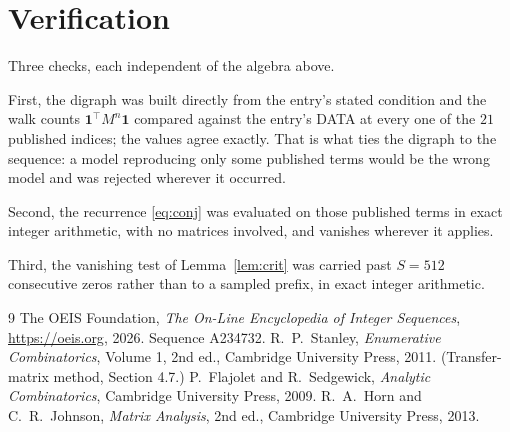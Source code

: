 \documentclass[11pt,a4paper]{article}
\theoremstyle{plain}
\theoremstyle{definition}
\begin{document}
\section{Verification}

Three checks, each independent of the algebra above.

First, the digraph was built directly from the entry's stated condition and the walk counts
$\mathbf{1}^{\!\top}M^{n}\mathbf{1}$ compared against the entry's DATA at every one of
the $21$ published indices; the values agree exactly. That is what ties the digraph to
the sequence: a model reproducing only some published terms would be the wrong model and
was rejected wherever it occurred.

Second, the recurrence \eqref{eq:conj} was evaluated on those published terms in exact
integer arithmetic, with no matrices involved, and vanishes wherever it applies.

Third, the vanishing test of Lemma~\ref{lem:crit} was carried past $S=512$ consecutive
zeros rather than to a sampled prefix, in exact integer arithmetic.

\begin{thebibliography}{9}
 The OEIS Foundation, \emph{The On-Line Encyclopedia of Integer
Sequences}, \url{https://oeis.org}, 2026. Sequence A234732.
 R.~P.~Stanley, \emph{Enumerative Combinatorics}, Volume 1, 2nd ed.,
Cambridge University Press, 2011. (Transfer-matrix method, Section 4.7.)
 P.~Flajolet and R.~Sedgewick, \emph{Analytic Combinatorics}, Cambridge
University Press, 2009.
 R.~A.~Horn and C.~R.~Johnson, \emph{Matrix Analysis}, 2nd ed., Cambridge
University Press, 2013.
\end{thebibliography}
\end{document}
